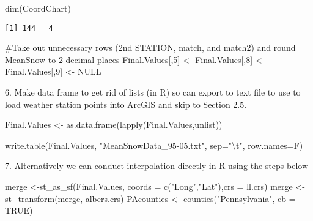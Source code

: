 \documentclass[
  letterpaper,
]{book}
\newenvironment{Shaded}{\begin{snugshade}}{\end{snugshade}}
\newcommand{\AttributeTok}[1]{\textcolor[rgb]{0.40,0.45,0.13}{#1}}
\newcommand{\CommentTok}[1]{\textcolor[rgb]{0.37,0.37,0.37}{#1}}
\newcommand{\ConstantTok}[1]{\textcolor[rgb]{0.56,0.35,0.01}{#1}}
\newcommand{\DecValTok}[1]{\textcolor[rgb]{0.68,0.00,0.00}{#1}}
\newcommand{\FunctionTok}[1]{\textcolor[rgb]{0.28,0.35,0.67}{#1}}
\newcommand{\NormalTok}[1]{\textcolor[rgb]{0.00,0.23,0.31}{#1}}
\newcommand{\OtherTok}[1]{\textcolor[rgb]{0.00,0.23,0.31}{#1}}
\newcommand{\SpecialCharTok}[1]{\textcolor[rgb]{0.37,0.37,0.37}{#1}}
\newcommand{\StringTok}[1]{\textcolor[rgb]{0.13,0.47,0.30}{#1}}
\begin{document}
\begin{Shaded}
\begin{Highlighting}[]
\FunctionTok{dim}\NormalTok{(CoordChart)}
\end{Highlighting}
\end{Shaded}

\begin{verbatim}
[1] 144   4
\end{verbatim}

\begin{Shaded}
\begin{Highlighting}[]
\CommentTok{\#Take out unnecessary rows (2nd STATION, match, and match2) and round MeanSnow to 2 decimal places}
\NormalTok{Final.Values[,}\DecValTok{5}\NormalTok{] }\OtherTok{\textless{}{-}}\NormalTok{ Final.Values[,}\DecValTok{8}\NormalTok{] }\OtherTok{\textless{}{-}}\NormalTok{ Final.Values[,}\DecValTok{9}\NormalTok{] }\OtherTok{\textless{}{-}} \ConstantTok{NULL}
\end{Highlighting}
\end{Shaded}

6. Make data frame to get rid of lists (in R) so can export to text file
to use to load weather station points into ArcGIS and skip to Section
2.5.

\begin{Shaded}
\begin{Highlighting}[]
\NormalTok{Final.Values }\OtherTok{\textless{}{-}} \FunctionTok{as.data.frame}\NormalTok{(}\FunctionTok{lapply}\NormalTok{(Final.Values,unlist))}
\end{Highlighting}
\end{Shaded}

\begin{Shaded}
\begin{Highlighting}[]
\FunctionTok{write.table}\NormalTok{(Final.Values, }\StringTok{"MeanSnowData\_95{-}05.txt"}\NormalTok{, }\AttributeTok{sep=}\StringTok{"}\SpecialCharTok{\textbackslash{}t}\StringTok{"}\NormalTok{, }\AttributeTok{row.names=}\NormalTok{F)}
\end{Highlighting}
\end{Shaded}

7. Alternatively we can conduct interpolation directly in R using the
steps below

\begin{Shaded}
\begin{Highlighting}[]
\NormalTok{merge }\OtherTok{\textless{}{-}}\FunctionTok{st\_as\_sf}\NormalTok{(Final.Values, }\AttributeTok{coords =} \FunctionTok{c}\NormalTok{(}\StringTok{"Long"}\NormalTok{,}\StringTok{"Lat"}\NormalTok{),}\AttributeTok{crs =}\NormalTok{ ll.crs)}
\NormalTok{merge }\OtherTok{\textless{}{-}} \FunctionTok{st\_transform}\NormalTok{(merge, albers.crs)}
\NormalTok{PAcounties }\OtherTok{\textless{}{-}} \FunctionTok{counties}\NormalTok{(}\StringTok{"Pennsylvania"}\NormalTok{, }\AttributeTok{cb =} \ConstantTok{TRUE}\NormalTok{) }
\end{Highlighting}
\end{Shaded}
\end{document}
